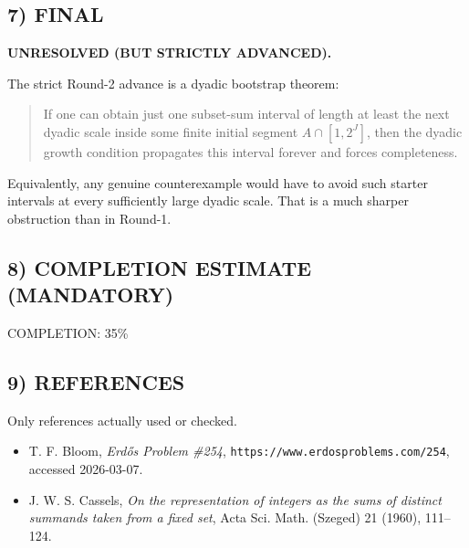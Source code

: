 \subsection*{7) FINAL}
\textbf{UNRESOLVED (BUT STRICTLY ADVANCED).}

The strict Round-2 advance is a dyadic bootstrap theorem:

\begin{quote}
If one can obtain just one subset-sum interval of length at least the next dyadic scale inside some finite initial segment $A\cap[1,2^J]$, then the dyadic growth condition propagates this interval forever and forces completeness.
\end{quote}

Equivalently, any genuine counterexample would have to avoid such starter intervals at every sufficiently large dyadic scale. That is a much sharper obstruction than in Round-1.

\subsection*{8) COMPLETION ESTIMATE (MANDATORY)}
COMPLETION: 35\%

\subsection*{9) REFERENCES}
Only references actually used or checked.

\begin{itemize}
\item T. F. Bloom, \emph{Erd\H{o}s Problem \#254}, \texttt{https://www.erdosproblems.com/254}, accessed 2026-03-07.
\item J. W. S. Cassels, \emph{On the representation of integers as the sums of distinct summands taken from a fixed set}, Acta Sci. Math. (Szeged) 21 (1960), 111--124.
\end{itemize}
